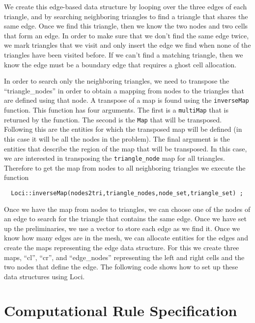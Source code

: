 \documentclass[10pt,epsf]{book}
\begin{document}
We create this edge-based data structure by looping over the three
edges of each triangle, and by searching neighboring triangles to find a
triangle that shares the same edge.  Once we find this triangle, then
we know the two nodes and two cells that form an edge.  In order to
make sure that we don't find the same edge twice, we mark triangles
that we visit and only insert the edge we find when none of the
triangles have been visited before.  If we can't find a matching
triangle, then we know the edge must be a boundary edge that requires
a ghost cell allocation.

In order to search only the neighboring triangles, we need to
transpose the ``triangle\_nodes'' in order to obtain a mapping from
nodes to the triangles that are defined using that node.  A transpose
of a map is found using the {\tt inverseMap} function.  This function has
four arguments.  The first is a {\tt multiMap} that is returned by the
function.  The second is the {\tt Map} that will be transposed.
Following this are the entities for which the transposed map will be
defined (in this case it will be all the nodes in the problem).  The
final argument is the entities that describe the region of the map
that will be transposed.  In this case, we are interested in
transposing the {\tt triangle\_node} map for all triangles.  Therefore
to get the map from nodes to all neighboring triangles we execute the
function 
\begin{verbatim}
  Loci::inverseMap(nodes2tri,triangle_nodes,node_set,triangle_set) ;
\end{verbatim}

Once we have the map from nodes to triangles, we can choose one of the
nodes of an edge to search for the triangle that contains the same
edge.  Once we have set up the preliminaries, we use a vector to store
each edge as we find it.  Once we know how many edges are in the mesh,
we can allocate entities for the edges and create the maps
representing the edge data structure.  For this we create three maps,
``cl'', ``cr'', and ``edge\_nodes'' representing the left and right
cells and the two nodes that define the edge.  The following code
shows how to set up these data structures using Loci.



\chapter{Computational Rule Specification}
\end{document}
